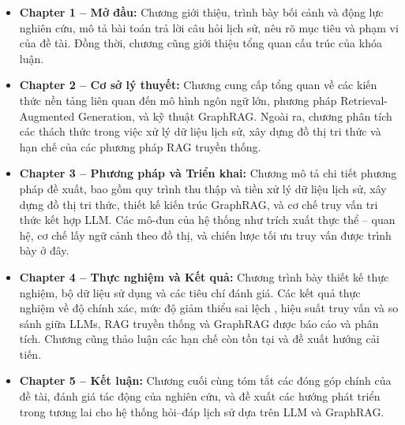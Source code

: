 \begin{itemize}
\item \textbf{Chapter 1 – Mở đầu:}
Chương giới thiệu, trình bày bối cảnh và động lực nghiên cứu, mô tả bài toán trả lời câu hỏi lịch sử, nêu rõ mục tiêu và phạm vi của đề tài. Đồng thời, chương cũng giới thiệu tổng quan cấu trúc của khóa luận.

\item \textbf{Chapter 2 – Cơ sở lý thuyết:}
Chương cung cấp tổng quan về các kiến thức nền tảng liên quan đến mô hình ngôn ngữ lớn, phương pháp Retrieval-Augmented Generation, và kỹ thuật GraphRAG. Ngoài ra, chương phân tích các thách thức trong việc xử lý dữ liệu lịch sử, xây dựng đồ thị tri thức và hạn chế của các phương pháp RAG truyền thống.

\item \textbf{Chapter 3 – Phương pháp và Triển khai:}
Chương mô tả chi tiết phương pháp đề xuất, bao gồm quy trình thu thập và tiền xử lý dữ liệu lịch sử, xây dựng đồ thị tri thức, thiết kế kiến trúc GraphRAG, và cơ chế truy vấn tri thức kết hợp LLM. Các mô-đun của hệ thống như trích xuất thực thể – quan hệ, cơ chế lấy ngữ cảnh theo đồ thị, và chiến lược tối ưu truy vấn được trình bày ở đây.

\item \textbf{Chapter 4 – Thực nghiệm và Kết quả:}
Chương trình bày thiết kế thực nghiệm, bộ dữ liệu sử dụng và các tiêu chí đánh giá. Các kết quả thực nghiệm về độ chính xác, mức độ giảm thiểu sai lệch , hiệu suất truy vấn và so sánh giữa LLMs, RAG truyền thống và GraphRAG được báo cáo và phân tích. Chương cũng thảo luận các hạn chế còn tồn tại và đề xuất hướng cải tiến.

\item \textbf{Chapter 5 – Kết luận:}
Chương cuối cùng tóm tắt các đóng góp chính của đề tài, đánh giá tác động của nghiên cứu, và đề xuất các hướng phát triển trong tương lai cho hệ thống hỏi–đáp lịch sử dựa trên LLM và GraphRAG.

\end{itemize}

\newpage